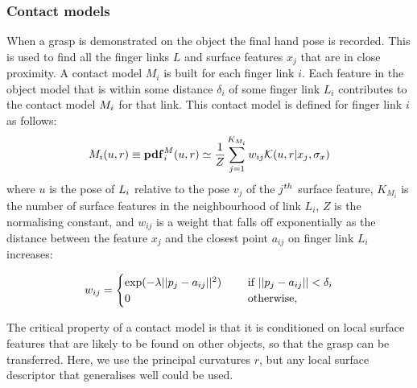 \subsubsection{Contact models}
When a grasp is demonstrated on the object the final hand pose is recorded. This is used to find all the finger links $L$ and surface features $x_j$ that are in close proximity. A contact model $M_i$ is built for each finger link $i$. Each feature in the object model that is within some distance $\delta_i$ of some finger link $L_i$ contributes to the contact model $M_i$ for that link. This contact model is defined for finger link $i$ as follows:
\begin{equation}
\cm_i(u, r) \equiv \pdf^\cm_i(u, r) \simeq \frac{1}{Z} \sum_{j=1}^{K_{M_i}} w_{ij} \mathcal{K}(u, r | {x_j}, \sigma_{x})
\label{eq:cm}
\end{equation}
where $u$ is the pose of $L_i$ relative to the pose $v_j$ of the $j^{\mathnormal{th}}$ surface feature, $K_{M_i}$ is the number of surface features in the neighbourhood of link $L_i$, $Z$ is the normalising constant, and $w_{ij}$ is a weight that falls off exponentially as the distance between the feature $x_j$ and the closest point $a_{ij}$ on finger link $L_i$ increases:

\begin{equation}
w_{ij} = \begin{cases}\exp(-\lambda ||p_j-a_{ij}||^2) \quad &\textnormal{ if } ||p_j-a_{ij}|| < \delta_i\\
0 \quad &\textnormal{ otherwise},\end{cases}
\label{eq:learning.modeldist.wgh}
\end{equation}

The critical property of a contact model is that it is conditioned on local surface features that are likely to be found on other objects, so that the grasp can be transferred. Here, we use the principal curvatures $r$, but any local surface descriptor that generalises well could be used. %
%
